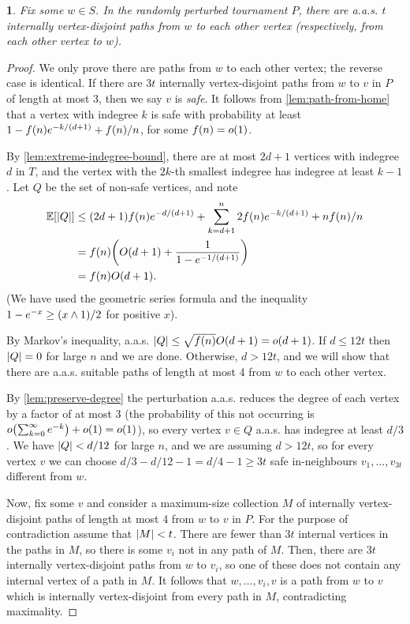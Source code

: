\documentclass[11pt,english]{article}
\theoremstyle{plain}
\theoremstyle{definition}
\theoremstyle{definition}
\theoremstyle{plain}
\theoremstyle{plain}
\theoremstyle{plain}
\newtheorem{lem}[thm]{\protect\lemmaname}
\theoremstyle{plain}
\theoremstyle{remark}
\theoremstyle{remark}
\let\originalleft\left
\let\originalright\right
\renewcommand{\left}{\mathopen{}\mathclose\bgroup\originalleft}
\renewcommand{\right}{\aftergroup\egroup\originalright}
\providecommand{\lemmaname}{Lemma}
\begin{document}
\begin{lem}
\label{lem:lots-of-paths}Fix some $w\in S$. In the randomly perturbed tournament $P$, there are a.a.s.{}
$t$ internally vertex-disjoint paths from $w$ to each other vertex
(respectively, from each other vertex to $w$).\end{lem}
\begin{proof}
We only prove there are paths from $w$ to each other vertex; the
reverse case is identical. If there are $3t$ internally vertex-disjoint
paths from $w$ to $v$ in $P$ of length at most 3, then we say $v$
is \emph{safe}. It follows from \ref{lem:path-from-home} that a vertex
with indegree $k$ is safe with probability at least $1-f\left(n\right)e^{-k/\left(d+1\right)}+f\left(n\right)/n$,
for some $f\left(n\right)=o\left(1\right)$.

By \ref{lem:extreme-indegree-bound}, there are at most $2d+1$ vertices
with indegree $d$ in $T$, and the vertex with the $2k$-th smallest
indegree has indegree at least $k-1$. Let $Q$ be the set of non-safe
vertices, and note 
\begin{align*}
\E\left[\left|Q\right|\right] & \le\left(2d+1\right)f\left(n\right)e^{-d/\left(d+1\right)}+\sum_{k=d+1}^{n}2f\left(n\right)e^{-k/\left(d+1\right)}+nf\left(n\right)/n\\
 & =f\left(n\right)\left(O\left(d+1\right)+\frac{1}{1-e^{-1/\left(d+1\right)}}\right)\\
 & =f\left(n\right)O\left(d+1\right).
\end{align*}
(We have used the geometric series formula and the inequality $1-e^{-x}\ge\left(x\land1\right)/2$
for positive $x$).

By Markov's inequality, a.a.s.{} $\left|Q\right|\le\sqrt{f\left(n\right)}O\left(d+1\right)=o\left(d+1\right)$.
If $d\le12t$ then $\left|Q\right|=0$ for large $n$ and we are done. Otherwise, $d>12t$, and we will show that there are a.a.s.{} suitable paths of length at most 4 from $w$ to each other vertex.

By \ref{lem:preserve-degree} the perturbation a.a.s.{} reduces the degree of each vertex by a factor of at most 3 (the probability of this not occurring is $o\left(\sum_{k=0}^\infty e^{-k}\right)+o\left(1\right)=o\left(1\right)$), so every vertex $v\in Q$ a.a.s.{} has indegree at least $d/3$. We have $\left|Q\right|<d/12$ for large $n$, and we are assuming $d>12t$, so for every vertex $v$ we can choose $d/3-d/12-1=d/4-1\ge 3t$ safe in-neighbours $v_{1},\dots,v_{3t}$ different from $w$.

Now, fix some $v$ and consider a maximum-size collection $M$ of internally vertex-disjoint paths of length at most 4 from $w$ to $v$ in $P$. For the purpose of contradiction assume that $\left|M\right|<t$. There are fewer than $3t$ internal vertices in the paths in $M$, so there is some $v_{i}$ not in any path of $M$. Then, there are $3t$ internally vertex-disjoint paths from $w$ to $v_{i}$, so one of these does not contain any
internal vertex of a path in $M$. It follows that $w,\dots,v_{i},v$ is a path from $w$ to $v$ which is
internally vertex-disjoint from every path in $M$, contradicting maximality.
\end{proof}
\end{document}
